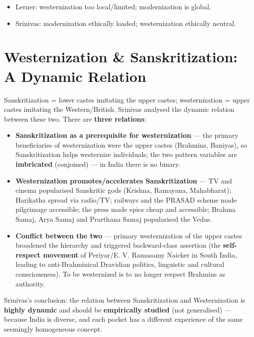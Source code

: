 \begin{QuickRevision}
\begin{itemize}
\item Lerner: westernization too local/limited; modernization is global.
\item Srinivas: modernization ethically loaded; westernization ethically neutral.
\end{itemize}
\end{QuickRevision}

\section{Westernization \& Sanskritization: A Dynamic Relation}

Sanskritization = lower castes imitating the upper castes; westernization = upper castes imitating the Western/British. Srinivas analysed the dynamic relation between these two. There are \textbf{three relations}:
\begin{itemize}
\item \textbf{Sanskritization as a prerequisite for westernization} --- the primary beneficiaries of westernization were the upper castes (Brahmins, Baniyas), so Sanskritization helps westernize individuals; the two pattern variables are \textbf{imbricated} (conjoined) --- in India there is no binary.
\item \textbf{Westernization promotes/accelerates Sanskritization} --- TV and cinema popularised Sanskritic gods (Krishna, Ramayana, Mahabharat); Harikatha spread via radio/TV; railways and the PRASAD scheme made pilgrimage accessible; the press made epics cheap and accessible; Brahma Samaj, Arya Samaj and Prarthana Samaj popularised the Vedas.
\item \textbf{Conflict between the two} --- primary westernization of the upper castes broadened the hierarchy and triggered backward-class assertion (the \textbf{self-respect movement} of Periyar/E. V. Ramasamy Naicker in South India, leading to anti-Brahminical Dravidian politics, linguistic and cultural consciousness). To be westernized is to no longer respect Brahmins as authority.
\end{itemize}

\begin{CriticalPoint}
Srinivas's conclusion: the relation between Sanskritization and Westernization is \textbf{highly dynamic} and should be \textbf{empirically studied} (not generalised) --- because India is diverse, and each pocket has a different experience of the same seemingly homogeneous concept.
\end{CriticalPoint}

